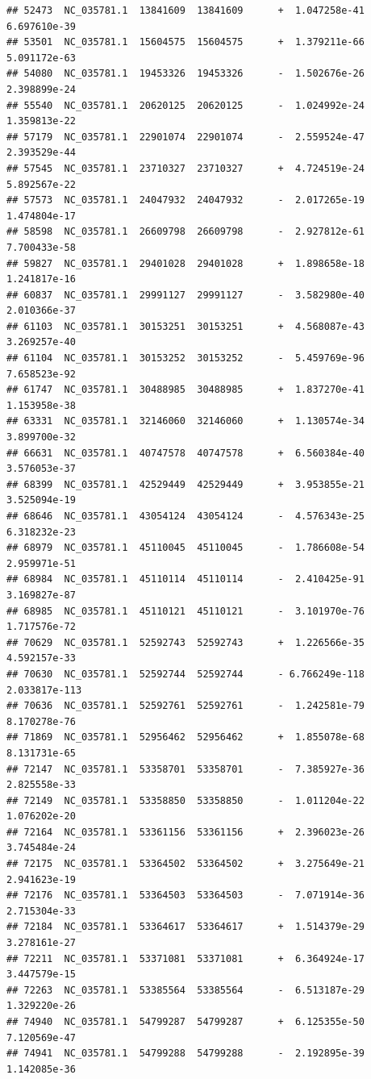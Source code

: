 \documentclass[]{article}
\begin{document}
\begin{verbatim}
## 52473  NC_035781.1  13841609  13841609      +  1.047258e-41  6.697610e-39
## 53501  NC_035781.1  15604575  15604575      +  1.379211e-66  5.091172e-63
## 54080  NC_035781.1  19453326  19453326      -  1.502676e-26  2.398899e-24
## 55540  NC_035781.1  20620125  20620125      -  1.024992e-24  1.359813e-22
## 57179  NC_035781.1  22901074  22901074      -  2.559524e-47  2.393529e-44
## 57545  NC_035781.1  23710327  23710327      +  4.724519e-24  5.892567e-22
## 57573  NC_035781.1  24047932  24047932      -  2.017265e-19  1.474804e-17
## 58598  NC_035781.1  26609798  26609798      -  2.927812e-61  7.700433e-58
## 59827  NC_035781.1  29401028  29401028      +  1.898658e-18  1.241817e-16
## 60837  NC_035781.1  29991127  29991127      -  3.582980e-40  2.010366e-37
## 61103  NC_035781.1  30153251  30153251      +  4.568087e-43  3.269257e-40
## 61104  NC_035781.1  30153252  30153252      -  5.459769e-96  7.658523e-92
## 61747  NC_035781.1  30488985  30488985      +  1.837270e-41  1.153958e-38
## 63331  NC_035781.1  32146060  32146060      +  1.130574e-34  3.899700e-32
## 66631  NC_035781.1  40747578  40747578      +  6.560384e-40  3.576053e-37
## 68399  NC_035781.1  42529449  42529449      +  3.953855e-21  3.525094e-19
## 68646  NC_035781.1  43054124  43054124      -  4.576343e-25  6.318232e-23
## 68979  NC_035781.1  45110045  45110045      -  1.786608e-54  2.959971e-51
## 68984  NC_035781.1  45110114  45110114      -  2.410425e-91  3.169827e-87
## 68985  NC_035781.1  45110121  45110121      -  3.101970e-76  1.717576e-72
## 70629  NC_035781.1  52592743  52592743      +  1.226566e-35  4.592157e-33
## 70630  NC_035781.1  52592744  52592744      - 6.766249e-118 2.033817e-113
## 70636  NC_035781.1  52592761  52592761      -  1.242581e-79  8.170278e-76
## 71869  NC_035781.1  52956462  52956462      +  1.855078e-68  8.131731e-65
## 72147  NC_035781.1  53358701  53358701      -  7.385927e-36  2.825558e-33
## 72149  NC_035781.1  53358850  53358850      -  1.011204e-22  1.076202e-20
## 72164  NC_035781.1  53361156  53361156      +  2.396023e-26  3.745484e-24
## 72175  NC_035781.1  53364502  53364502      +  3.275649e-21  2.941623e-19
## 72176  NC_035781.1  53364503  53364503      -  7.071914e-36  2.715304e-33
## 72184  NC_035781.1  53364617  53364617      +  1.514379e-29  3.278161e-27
## 72211  NC_035781.1  53371081  53371081      +  6.364924e-17  3.447579e-15
## 72263  NC_035781.1  53385564  53385564      -  6.513187e-29  1.329220e-26
## 74940  NC_035781.1  54799287  54799287      +  6.125355e-50  7.120569e-47
## 74941  NC_035781.1  54799288  54799288      -  2.192895e-39  1.142085e-36

\end{verbatim}
\end{document}
